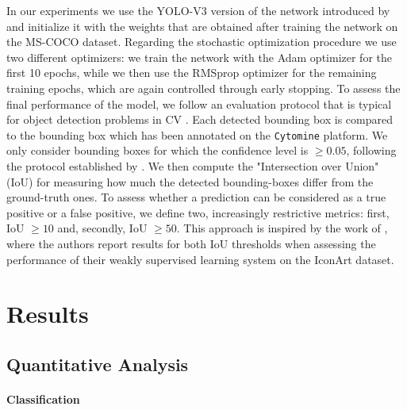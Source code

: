 In our experiments we use the YOLO-V3 version of the network introduced by \citet{redmon2018yolov3} and initialize it with the weights that are obtained after training the network on the MS-COCO dataset. Regarding the stochastic optimization procedure we use two different optimizers: we train the network with the Adam optimizer for the first 10 epochs, while we then use the RMSprop optimizer for the remaining training epochs, which are again controlled through early stopping. To assess the final performance of the model, we follow an evaluation protocol that is typical for object detection problems in CV \cite{lin2014microsoft}. Each detected bounding box is compared to the bounding box which has been annotated on the \texttt{Cytomine} platform. We only consider bounding boxes for which the confidence level is $\geq 0.05$, following the protocol established by \citet{everingham2010pascal}. We then compute the "Intersection over Union" (IoU) for measuring how much the detected bounding-boxes differ from the ground-truth ones. To assess whether a prediction can be considered as a true positive or a false positive, we define two, increasingly restrictive metrics: first, IoU $\geq10$ and, secondly, IoU $\geq50$. This approach is inspired by the work of \citet{gonthier2018weakly}, where the authors report results for both IoU thresholds when assessing the performance of their weakly supervised learning system on the IconArt dataset.

\section{Results}
\label{sec:minerva_results}

\subsection{Quantitative Analysis}
\label{sec:quantitative_analysis}
\paragraph{Classification}


